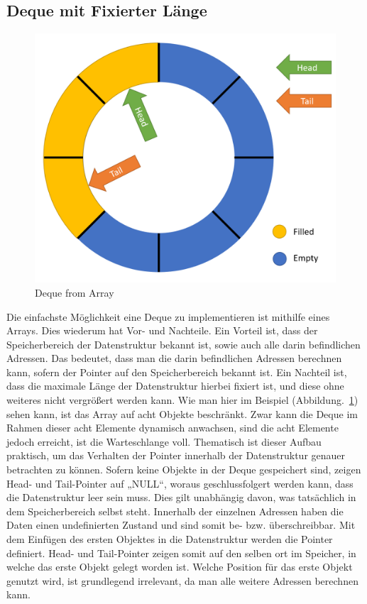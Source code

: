 \documentclass{TUBAFarbeiten}
\begin{document}
\subsection{Deque mit Fixierter Länge}
\begin{figure}
\includegraphics[scale=0.2]{Deque-Limited}
\caption{Deque from Array}
\label{fig:Img1}
\end{figure}
Die einfachste Möglichkeit eine Deque zu implementieren ist mithilfe eines Arrays. Dies wiederum hat Vor- und Nachteile. Ein Vorteil ist, dass der Speicherbereich der Datenstruktur bekannt ist, sowie auch alle darin befindlichen Adressen. Das bedeutet, dass man die darin befindlichen Adressen berechnen kann, sofern der Pointer auf den Speicherbereich bekannt ist. Ein Nachteil ist, dass die maximale Länge der Datenstruktur hierbei fixiert ist, und diese ohne weiteres nicht vergrößert werden kann. Wie man hier im Beispiel (Abbildung.~\ref{fig:Img1}) sehen kann, ist das Array auf acht Objekte beschränkt. Zwar kann die Deque im Rahmen dieser acht Elemente dynamisch anwachsen, sind die acht Elemente jedoch erreicht, ist die Warteschlange voll. Thematisch ist dieser Aufbau praktisch, um das Verhalten der Pointer innerhalb der Datenstruktur genauer betrachten zu können.  \newline
Sofern keine Objekte in der Deque gespeichert sind, zeigen Head- und Tail-Pointer auf „NULL“, woraus geschlussfolgert werden kann, dass die Datenstruktur leer sein muss. Dies gilt unabhängig davon, was tatsächlich in dem Speicherbereich selbst steht. Innerhalb der einzelnen Adressen haben die Daten einen undefinierten Zustand und sind somit be- bzw. überschreibbar. Mit dem Einfügen des ersten Objektes in die Datenstruktur werden die Pointer definiert. Head- und Tail-Pointer zeigen somit auf den selben ort im Speicher, in welche das erste Objekt gelegt worden ist. Welche Position für das erste Objekt genutzt wird, ist grundlegend irrelevant, da man alle weitere Adressen berechnen kann.\newpage 
\end{document}
